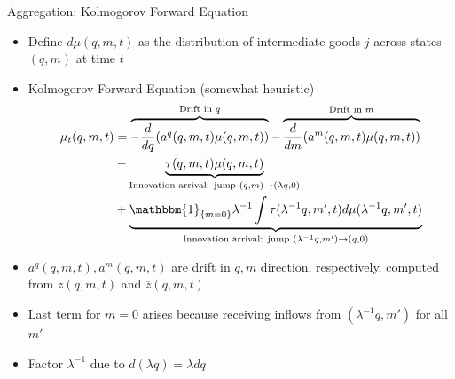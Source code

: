\documentclass[english,usenames,dvipsnames]{beamer}
\begin{document}
\begin{frame}{Aggregation: Kolmogorov Forward Equation}
\begin{itemize}
	\small
	\item Define $d\mu(q,m,t)$ as the distribution of intermediate goods $j$ across states $(q,m)$ at time $t$
	\item Kolmogorov Forward Equation (somewhat heuristic) 
	\begin{align*}
	\mu_t(q,m,t) &= \overbrace{-\frac{d}{dq} (a^q(q,m,t) \mu(q,m,t))}^{\text{Drift in $q$}} - \overbrace{\frac{d}{dm} (a^m(q,m,t) \mu(q,m,t))}^{\text{Drift in $m$}} \\ 
				 & - \underbrace{\tau(q,m,t)\mu(q,m,t)}_{\text{Innovation arrival: jump } (q,m) \to (\lambda q,0)} \\
				 & + \underbrace{\mathbbm{1}_{\{m = 0 \}}\lambda^{-1} \int \tau(\lambda^{-1}q,m',t) d\mu(\lambda^{-1}q,m',t)}_{\text{Innovation arrival: jump } (\lambda^{-1}q,m') \to (q,0)}
	\end{align*}
	\item $a^q(q,m,t),a^m(q,m,t)$ are drift in $q,m$ direction, respectively, computed from $z(q,m,t)$ and $\overline{z}(q,m,t)$
	\item Last term for $m = 0$ arises because receiving inflows from $(\lambda^{-1}q,m')$ for all $m'$ 
	\item Factor $\lambda^{-1}$ due to $d(\lambda q) = \lambda dq$
\end{itemize}
\end{frame}
\end{document}
